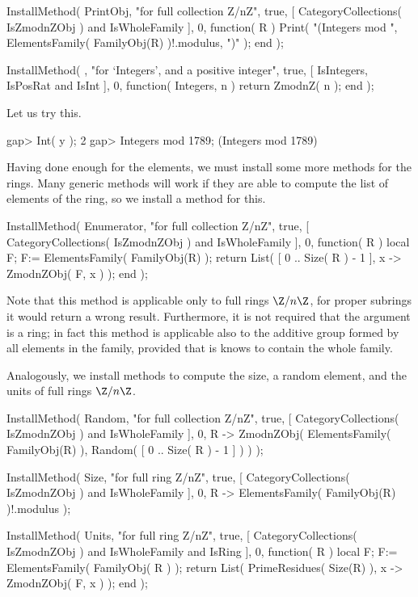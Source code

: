 \begintt
    InstallMethod( PrintObj,
        "for full collection Z/nZ",
        true,
        [ CategoryCollections( IsZmodnZObj ) and IsWholeFamily ], 0,
        function( R )
        Print( "(Integers mod ",
               ElementsFamily( FamilyObj(R) )!.modulus, ")" );
        end );

    InstallMethod( \mod,
        "for `Integers', and a positive integer",
        true,
        [ IsIntegers, IsPosRat and IsInt ], 0,
        function( Integers, n ) return ZmodnZ( n ); end );
\endtt

Let us try this.

\begintt
    gap> Int( y );
    2
    gap> Integers mod 1789;
    (Integers mod 1789)
\endtt

Having done enough for the elements,
we must install some more methods for the rings.
Many generic methods will work if they are able to compute the
list of elements of the ring,
so we install a method for this.

\begintt
    InstallMethod( Enumerator,
        "for full collection Z/nZ",
        true,
        [ CategoryCollections( IsZmodnZObj ) and IsWholeFamily ], 0,
        function( R )
        local F;
        F:= ElementsFamily( FamilyObj(R) );
        return List( [ 0 .. Size( R ) - 1 ], x -> ZmodnZObj( F, x ) );
        end );
\endtt

Note that this method is applicable only to full rings $\Z/n\Z$,
for proper subrings it would return a wrong result.
Furthermore, it is not required that the argument is a ring;
in fact this method is applicable also to the additive group
formed by all elements in the family,
provided that is knows to contain the whole family.

Analogously, we install methods to compute the size,
a random element, and the units of full rings $\Z/n\Z$.

\begintt
    InstallMethod( Random,
        "for full collection Z/nZ",
        true,
        [ CategoryCollections( IsZmodnZObj ) and IsWholeFamily ], 0,
        R -> ZmodnZObj( ElementsFamily( FamilyObj(R) ),
                        Random( [ 0 .. Size( R ) - 1 ] ) ) );

    InstallMethod( Size,
        "for full ring Z/nZ",
        true,
        [ CategoryCollections( IsZmodnZObj ) and IsWholeFamily ], 0,
        R -> ElementsFamily( FamilyObj(R) )!.modulus );

    InstallMethod( Units,
        "for full ring Z/nZ",
        true,
        [     CategoryCollections( IsZmodnZObj )
          and IsWholeFamily and IsRing ], 0,
        function( R )
        local F;
        F:= ElementsFamily( FamilyObj( R ) );
        return List( PrimeResidues( Size(R) ), x -> ZmodnZObj( F, x ) );
        end );
\endtt


